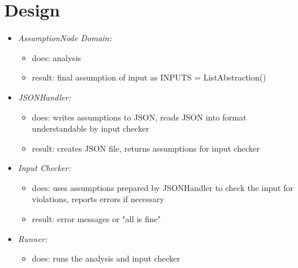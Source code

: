 \documentclass[11pt]{article}
\begin{document}
\section{Design}

\begin{itemize}
\item \textit{AssumptionNode Domain:}
\begin{itemize}
\item does: analysis
\item result: final assumption of input as INPUTS = ListAbstraction()
\end{itemize}

\item \textit{JSONHandler:} 
\begin{itemize}
\item does: writes assumptions to JSON, reads JSON into format understandable by input checker
\item result: creates JSON file, returns assumptions for input checker
\end{itemize}


\item \textit{Input Checker:} 
\begin{itemize}
\item does: uses assumptions prepared by JSONHandler to check the input for violations, reports errors if necessary
\item result: error messages or "all is fine"
\end{itemize}


\item \textit{Runner:} 
\begin{itemize}
\item does: runs the analysis and input checker
\end{itemize}

\end{itemize}
\end{document}

